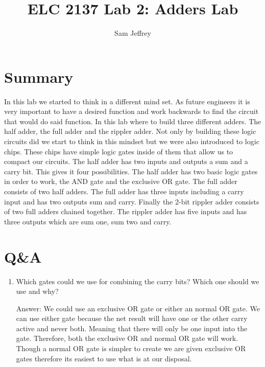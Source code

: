 \documentclass[11pt]{article}
\begin{document}
\title{ELC 2137 Lab 2: Adders Lab}
\author{Sam Jeffrey}

\maketitle


\section*{Summary}

In this lab we started to think in a different mind set. As future engineers it is very important to have a desired function and work backwards to find the circuit that would do said function. In this lab where to build three different adders. The half adder, the full adder and the rippler adder. Not only by building these logic circuits did we start to think in this mindset but we were also introduced to logic chips. These chips have simple logic gates inside of them that allow us to compact our circuits. The half adder has two inputs and outputs a sum and a carry bit. This gives it four possibilities. The half adder has two basic logic gates in order to work, the AND gate and the exclusive OR gate. The full adder consists of two half adders. The full adder has three inputs including a carry input and has two outputs sum and carry. Finally the 2-bit rippler adder consists of two full adders chained together. The rippler adder has five inputs and has three outputs which are sum one, sum two and carry. 


\section*{Q\&A}

\begin{enumerate}
	\item  Which gates could we use for combining the carry bits? Which one should we use and why?
	
	
	Answer: We could use an exclusive OR gate or either an normal OR gate. We can use either gate because the net result will have one or the other carry active and never both. Meaning that there will only be one input into the gate. Therefore, both the exclusive OR and normal OR gate will work. Though a normal OR gate is simpler to create we are given exclusive OR gates therefore its easiest to use what is at our disposal. 
	
\end{enumerate}
	
\end{document}
